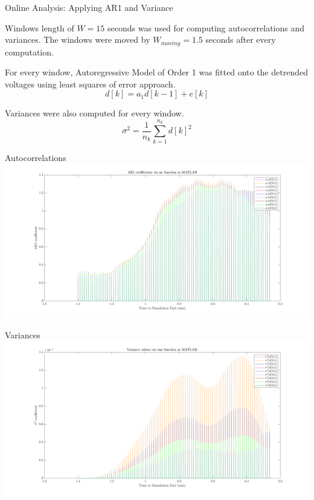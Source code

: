 \begin{frame}{Online Analysis: Applying AR1 and Variance}
	
	Windows length of $W = 15$ seconds was used for computing autocorrelations and variances.
	The windows were moved by $W_{moving} = 1.5$ seconds after every computation.
	
	For every window, Autoregressive Model of Order 1 was fitted onto the detrended voltages using least squares of error approach.
	\begin{equation}
	\label{eq:autocorrDef}
	d[k] = a_1 d[k-1] + e[k]
	\end{equation} 
	
	Variances were also computed for every window.
	\begin{equation}
	\label{eq:varDef}
	\sigma^2 = \frac{1}{n_k} \sum_{k=1}^{n_k} d[k]^2
	\end{equation} 
\end{frame}

\begin{frame}{Autocorrelations}
	\includegraphics[scale=0.18]{../figures/im01.png}
\end{frame}

\begin{frame}{Variances}
	\includegraphics[scale=0.18]{../figures/im02.png}
\end{frame}